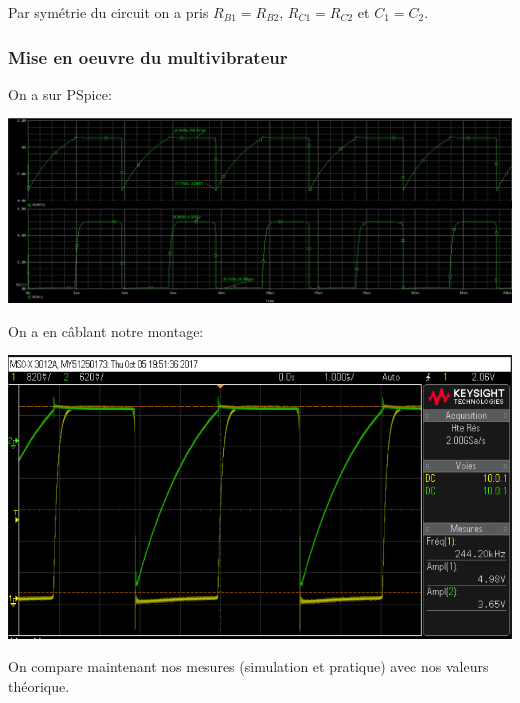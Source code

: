 \documentclass[a4paper]{report}
\begin{document}
\vspace{0.5cm}
Par symétrie du circuit on a pris $R_{B1}=R_{B2}$, $R_{C1}=R_{C2}$ et  $ C_{1} = C_{2}$.\\

\newpage


\subsubsection{Mise en oeuvre du multivibrateur}

On a sur PSpice:
\begin{center}
\includegraphics[width=1\textwidth]{multivib_simu.PNG}
\end{center}

On a en câblant notre montage:

\begin{center}
\includegraphics[width=1\textwidth]{Simu_multivib.PNG}
\end{center}

On compare maintenant nos mesures (simulation et pratique) avec nos valeurs théorique.\\
\end{document}
